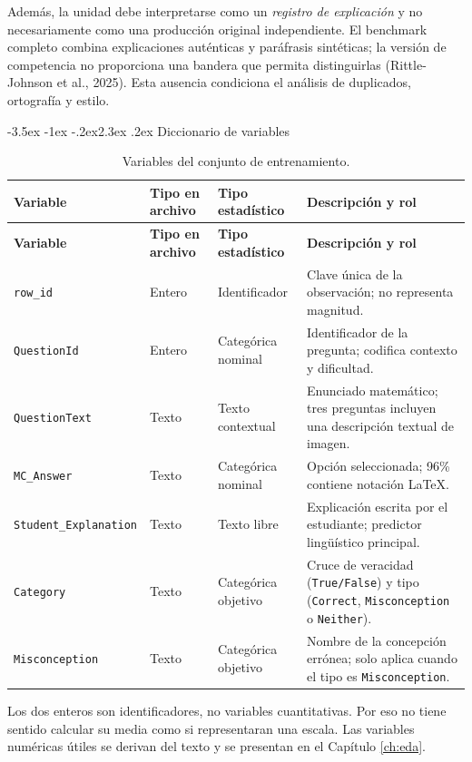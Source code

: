 \documentclass[11pt,oneside,openany]{book}
\makeatletter
\renewcommand\section{\@startsection{section}{1}{\z@}%
  {-3.5ex \@plus -1ex \@minus -.2ex}{2.3ex \@plus .2ex}%
  {\normalfont\Large\sffamily\bfseries\color{AzulMedio}}}
\newcommand{\codigo}[1]{\texttt{#1}}
\makeatother
\begin{document}
Además, la unidad debe interpretarse como un \emph{registro de explicación} y
no necesariamente como una producción original independiente. El benchmark
completo combina explicaciones auténticas y paráfrasis sintéticas; la versión
de competencia no proporciona una bandera que permita distinguirlas
(Rittle-Johnson et al., 2025). Esta ausencia condiciona el análisis de
duplicados, ortografía y estilo.

\section{Diccionario de variables}

\small
\begin{longtable}{@{}p{3.5cm}p{3.0cm}p{2.8cm}p{4.7cm}@{}}
\caption{Variables del conjunto de entrenamiento.}
\label{tab:variables}\\
\toprule
\textbf{Variable} & \textbf{Tipo en archivo} & \textbf{Tipo estadístico} &
\textbf{Descripción y rol}\\
\midrule
\endfirsthead
\toprule
\textbf{Variable} & \textbf{Tipo en archivo} & \textbf{Tipo estadístico} &
\textbf{Descripción y rol}\\
\midrule
\endhead
\bottomrule
\endlastfoot
\codigo{row\_id} & Entero & Identificador & Clave única de la observación; no
representa magnitud.\\
\codigo{QuestionId} & Entero & Categórica nominal & Identificador de la
pregunta; codifica contexto y dificultad.\\
\codigo{QuestionText} & Texto & Texto contextual & Enunciado matemático; tres
preguntas incluyen una descripción textual de imagen.\\
\codigo{MC\_Answer} & Texto & Categórica nominal & Opción seleccionada; 96\%
contiene notación LaTeX.\\
\codigo{Student\_}\linebreak\codigo{Explanation} & Texto & Texto libre & Explicación escrita por el
estudiante; predictor lingüístico principal.\\
\codigo{Category} & Texto & Categórica objetivo & Cruce de veracidad
(\codigo{True/False}) y tipo (\codigo{Correct}, \codigo{Misconception} o
\codigo{Neither}).\\
\codigo{Misconception} & Texto & Categórica objetivo & Nombre de la concepción
errónea; solo aplica cuando el tipo es \codigo{Misconception}.\\
\end{longtable}

Los dos enteros son identificadores, no variables cuantitativas. Por eso no
tiene sentido calcular su media como si representaran una escala. Las variables
numéricas útiles se derivan del texto y se presentan en el Capítulo
\ref{ch:eda}.
\end{document}
